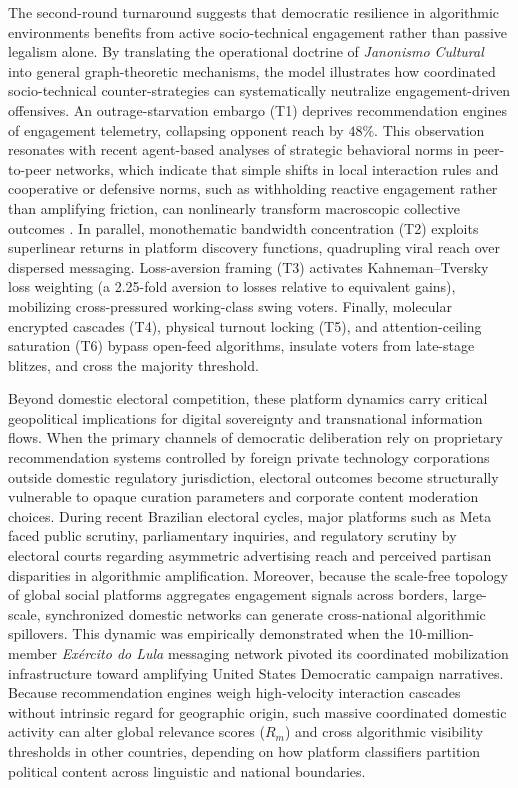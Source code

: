 \documentclass[11pt,a4paper]{article}
\begin{document}
The second-round turnaround suggests that democratic resilience in algorithmic environments benefits from active socio-technical engagement rather than passive legalism alone. By translating the operational doctrine of \emph{Janonismo Cultural} into general graph-theoretic mechanisms, the model illustrates how coordinated socio-technical counter-strategies can systematically neutralize engagement-driven offensives. An outrage-starvation embargo (T1) deprives recommendation engines of engagement telemetry, collapsing opponent reach by $48\%$. This observation resonates with recent agent-based analyses of strategic behavioral norms in peer-to-peer networks, which indicate that simple shifts in local interaction rules and cooperative or defensive norms, such as withholding reactive engagement rather than amplifying friction, can nonlinearly transform macroscopic collective outcomes \citep{alvarenga2026power}. In parallel, monothematic bandwidth concentration (T2) exploits superlinear returns in platform discovery functions, quadrupling viral reach over dispersed messaging. Loss-aversion framing (T3) activates Kahneman--Tversky loss weighting (a 2.25-fold aversion to losses relative to equivalent gains), mobilizing cross-pressured working-class swing voters. Finally, molecular encrypted cascades (T4), physical turnout locking (T5), and attention-ceiling saturation (T6) bypass open-feed algorithms, insulate voters from late-stage blitzes, and cross the majority threshold.

Beyond domestic electoral competition, these platform dynamics carry critical geopolitical implications for digital sovereignty and transnational information flows. When the primary channels of democratic deliberation rely on proprietary recommendation systems controlled by foreign private technology corporations outside domestic regulatory jurisdiction, electoral outcomes become structurally vulnerable to opaque curation parameters and corporate content moderation choices. During recent Brazilian electoral cycles, major platforms such as Meta faced public scrutiny, parliamentary inquiries, and regulatory scrutiny by electoral courts regarding asymmetric advertising reach and perceived partisan disparities in algorithmic amplification. Moreover, because the scale-free topology of global social platforms aggregates engagement signals across borders, large-scale, synchronized domestic networks can generate cross-national algorithmic spillovers. This dynamic was empirically demonstrated when the 10-million-member \emph{Ex\'ercito do Lula} messaging network pivoted its coordinated mobilization infrastructure toward amplifying United States Democratic campaign narratives. Because recommendation engines weigh high-velocity interaction cascades without intrinsic regard for geographic origin, such massive coordinated domestic activity can alter global relevance scores ($R_m$) and cross algorithmic visibility thresholds in other countries, depending on how platform classifiers partition political content across linguistic and national boundaries.
\end{document}
